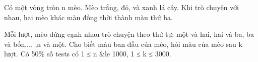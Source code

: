Có một vòng tròn n mèo. Mèo trắng, đỏ, và xanh lá cây. Khi trò chuyện với nhau, hai mèo khác màu đồng thời thành màu thứ ba.

Mỗi lượt, mèo đứng cạnh nhau trò chuyện theo thứ tự: một và hai, hai và ba, ba và bốn,... ,n và một.
Cho biết màu ban đầu của mèo, hỏi màu của mèo sau k lượt.
Có 50\% số tests có 1 ≤ n \&le 1000, 1 ≤ k ≤ 3000.